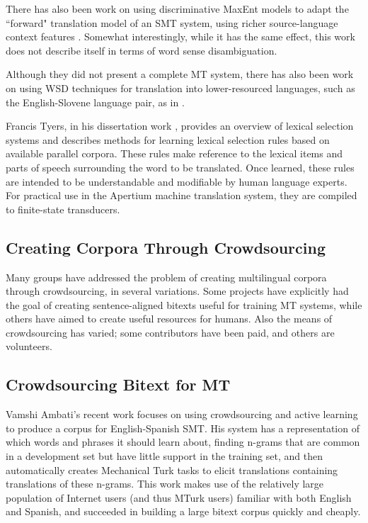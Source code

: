 There has also been work on using discriminative MaxEnt models to adapt
the ``forward" translation model of an SMT system, using richer
source-language context features \cite{vzabokrtsky-popel-marevcek:2010:WMT}.
Somewhat interestingly, while it has the same effect, this work does not
describe itself in terms of word sense disambiguation.

Although they did not present a complete MT system, there has also been work
on using WSD techniques for translation into lower-resourced languages, such as
the English-Slovene language pair, as in
\cite{vintar-fivser-vrvsvcaj:2012:ESIRMT-HyTra2012}. 


Francis Tyers, in his dissertation work \cite{tyers-thesis},
provides an overview of lexical selection systems and describes methods for
learning lexical selection rules based on available parallel corpora.
These rules make reference to the lexical items and parts of speech surrounding
the word to be translated. Once learned, these rules are intended to be
understandable and modifiable by human language experts. For practical use in
the Apertium machine translation system, they are compiled to finite-state
transducers.

\subsection{Creating Corpora Through Crowdsourcing}
Many groups have addressed the problem of creating multilingual corpora through
crowdsourcing, in several variations. Some projects have explicitly had the
goal of creating sentence-aligned bitexts useful for training MT systems, while
others have aimed to create useful resources for humans. Also the means of
crowdsourcing has varied; some contributors have been paid, and others are
volunteers.

\subsection{Crowdsourcing Bitext for MT}
Vamshi Ambati's recent work \cite{ambati_naacl,ambati_act} focuses on using
crowdsourcing and active learning to produce a corpus for English-Spanish SMT.
His system has a representation of which words and phrases it should learn
about, finding n-grams that are common in a development set but have little
support in the training set, and then automatically creates Mechanical Turk
tasks to elicit translations containing translations of these n-grams. This
work makes use of the relatively large population of Internet users (and thus
MTurk users) familiar with both English and Spanish, and succeeded in building
a large bitext corpus quickly and cheaply.

